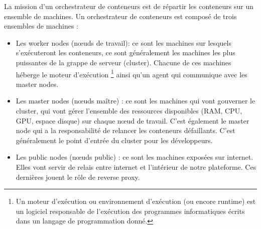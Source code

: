 \documentclass[11pt,fleqn]{book} %
\begin{document}
La mission d'un orchestrateur de conteneurs est de répartir les conteneurs sur un ensemble de machines. Un orchestrateur de conteneurs est composé de trois ensembles de machines :
\begin{itemize}
    \item Les worker nodes (nœuds de travail): ce sont les machines sur lesquels s'exécuteront les conteneurs, ce sont généralement les machines les plus puissantes de la grappe de serveur (cluster). Chacune de ces machines héberge le moteur d'exécution \footnote{Un moteur d'exécution ou environnement d'exécution (ou encore runtime) est un logiciel responsable de l'exécution des programmes informatiques écrits dans un langage de programmation donné.} ainsi qu'un agent qui communique avec les master nodes.
    \item Les master nodes (nœuds maître) : ce sont les machines qui vont gouverner le cluster, qui vont gérer l'ensemble des ressources disponibles (RAM, CPU, GPU, espace disque) sur chaque nœud de travail. C'est également le master node qui a la responsabilité de relancer les conteneurs défaillants. C'est généralement le point d'entrée du cluster pour les développeurs.
    \item Les public nodes (nœuds public) :  ce sont les machines exposées sur internet. Elles vont servir de relais entre internet et l'intérieur de notre plateforme. Ces dernières jouent le rôle de reverse proxy.\\
\end{itemize}
 
\end{document}
